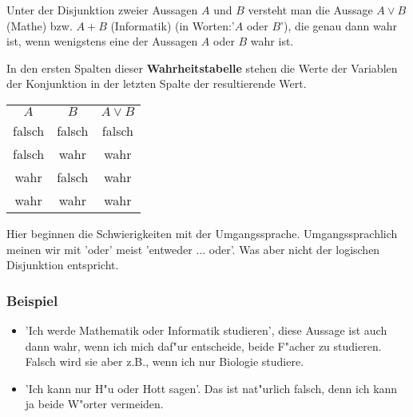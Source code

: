 \begin{definition}[Disjunktion]
Unter der Disjunktion zweier Aussagen $A$ und $B$ versteht man die Aussage $A \lor B$ (Mathe) bzw. $A + B$ (Informatik) (in Worten:'$A$ oder $B$'), die genau dann wahr ist, wenn wenigstens eine der Aussagen $A$ oder $B$ wahr ist.
\end{definition}
In den ersten Spalten dieser \textbf{Wahrheitstabelle} stehen die Werte der Variablen der Konjunktion in der letzten Spalte der resultierende Wert.
\begin{center}
\begin{tabular}{c|c||c}
$A$& $B$  &  $A \lor B$  \\ 
 \cellcolor{ared}falsch & \cellcolor{ared} falsch & \cellcolor{ared}falsch   \\ 
 \cellcolor{ared}falsch & \cellcolor{agreen}wahr & \cellcolor{agreen}wahr  \\ 
 \cellcolor{agreen}wahr & \cellcolor{ared} falsch & \cellcolor{agreen}wahr   \\ 
\cellcolor{agreen}wahr & \cellcolor{agreen}wahr & \cellcolor{agreen}wahr  \\ 
\hline
\end{tabular}
\end{center}
Hier beginnen die Schwierigkeiten mit der Umgangssprache. Umgangssprachlich meinen wir mit 'oder' meist 'entweder $\ldots$ oder'. Was aber nicht der logischen Disjunktion entspricht.

\subsubsection*{Beispiel}
\begin{itemize}
	\item 'Ich werde Mathematik oder Informatik studieren', diese Aussage ist auch dann wahr, wenn ich mich daf"ur entscheide, beide F"acher zu studieren. Falsch wird sie aber z.B., wenn ich nur Biologie studiere.
	\item 'Ich kann nur H"u oder Hott sagen'. Das ist nat"urlich falsch, denn ich kann ja beide W"orter vermeiden.
\end{itemize}


